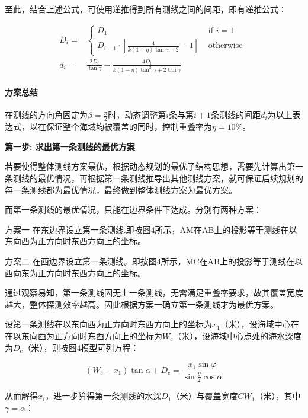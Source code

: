至此，结合上述公式，可使用递推得到所有测线之间的间距，即有递推公式：

\begin{align}
    D_{i} = & \begin{cases}
        D_1 & \text{ if } i = 1 \\
        D_{i - 1} \cdot \left[\frac{4}{k(1 - \eta) \tan \gamma + 2} - 1\right] & \text{ otherwise }
    \end{cases}\\
    d_i = & \frac{2D_i}{\tan \gamma} - \frac{4D_i}{k(1-\eta) \tan^2 \gamma + 2 \tan \gamma}
\end{align}

\paragraph{方案总结}

在测线的方向角固定为$\beta = \frac{\pi}{2}$时，动态调整第$i$条与第$i + 1$条测线的间距$d_i$为以上表达式，以在保证整个海域均被覆盖的同时，控制重叠率为$\eta = 10\%$。


\textbf{第一步: 求出第一条测线的最优方案}

若要使得整体测线方案最优，根据动态规划的最优子结构思想，需要先计算出第一条测线的最优情况，再根据第一条测线推导出其他测线方案，就可保证后续规划的每一条测线都为最优情况，最终做到整体测线方案为最优方案。

而第一条测线的最优情况，只能在边界条件下达成。分别有两种方案：

方案一 在东边界设立第一条测线.即按图4所示，AM在AB上的投影等于测线在以东向西为正方向时东西方向上的坐标。

方案二 在西边界设立第一条测线。即按图4所示，MC在AB上的投影等于测线在以西向东为正方向时东西方向上的坐标。

通过观察易知，第一条测线因无上一条测线，无需满足重叠率要求，故其覆盖宽度越大，整体探测效率越高。因此根据方案一确立第一条测线才为最优方案。

设第一条测线在以东向西为正方向时东西方向上的坐标为$x_1$（米），设海域中心在在以东向西为正方向时东西方向上的坐标为$W_c$（米），设海域中心点处的海水深度为$D_c$（米），则按图4模型可列方程：

\begin{equation}
    (W_c - x_1) \tan\alpha+D_c = \frac{x_1\sin \varphi}{\sin \frac{\theta}{2} \cos \alpha} 
\end{equation}

从而解得$x_i$，进一步算得第一条测线的水深$D_1$（米）与覆盖宽度$CW_1$（米），其中$\gamma = \alpha$：

